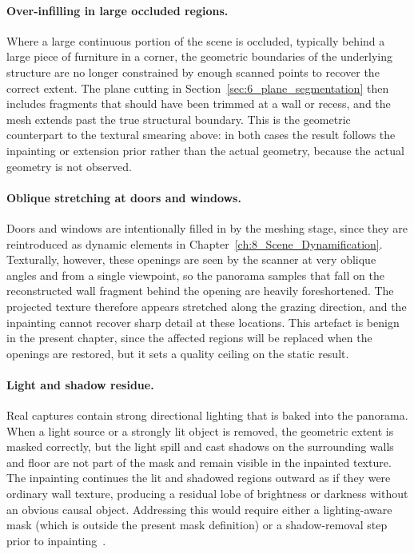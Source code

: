 \paragraph{Over-infilling in large occluded regions.}
Where a large continuous portion of the scene is occluded, typically behind a large piece of furniture in a corner, the geometric boundaries of the underlying structure are no longer constrained by enough scanned points to recover the correct extent. The plane cutting in Section~\ref{sec:6_plane_segmentation} then includes fragments that should have been trimmed at a wall or recess, and the mesh extends past the true structural boundary. This is the geometric counterpart to the textural smearing above: in both cases the result follows the inpainting or extension prior rather than the actual geometry, because the actual geometry is not observed.
 
\paragraph{Oblique stretching at doors and windows.}
Doors and windows are intentionally filled in by the meshing stage, since they are reintroduced as dynamic elements in Chapter~\ref{ch:8_Scene_Dynamification}. Texturally, however, these openings are seen by the scanner at very oblique angles and from a single viewpoint, so the panorama samples that fall on the reconstructed wall fragment behind the opening are heavily foreshortened. The projected texture therefore appears stretched along the grazing direction, and the inpainting cannot recover sharp detail at these locations. This artefact is benign in the present chapter, since the affected regions will be replaced when the openings are restored, but it sets a quality ceiling on the static result.
 
\paragraph{Light and shadow residue.}
Real captures contain strong directional lighting that is baked into the panorama. When a light source or a strongly lit object is removed, the geometric extent is masked correctly, but the light spill and cast shadows on the surrounding walls and floor are not part of the mask and remain visible in the inpainted texture. The inpainting continues the lit and shadowed regions outward as if they were ordinary wall texture, producing a residual lobe of brightness or darkness without an obvious causal object. Addressing this would require either a lighting-aware mask (which is outside the present mask definition) or a shadow-removal step prior to inpainting~\cite{slavcheva_empty_2024}.
 
